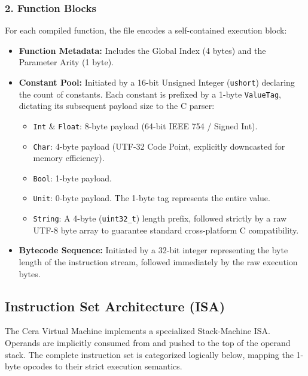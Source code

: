 \documentclass[11pt, a4paper]{article}
\begin{document}
\subsubsection*{2. Function Blocks}
For each compiled function, the file encodes a self-contained execution block:
\begin{itemize}
    \item \textbf{Function Metadata:} Includes the Global Index (4 bytes) and the Parameter Arity (1 byte).
    \item \textbf{Constant Pool:} Initiated by a 16-bit Unsigned Integer (\texttt{ushort}) declaring the count of constants. Each constant is prefixed by a 1-byte \texttt{ValueTag}, dictating its subsequent payload size to the C parser:
    \begin{itemize}
        \item \texttt{Int} \& \texttt{Float}: 8-byte payload (64-bit IEEE 754 / Signed Int).
        \item \texttt{Char}: 4-byte payload (UTF-32 Code Point, explicitly downcasted for memory efficiency).
        \item \texttt{Bool}: 1-byte payload.
        \item \texttt{Unit}: 0-byte payload. The 1-byte tag represents the entire value.
        \item \texttt{String}: A 4-byte (\texttt{uint32\_t}) length prefix, followed strictly by a raw UTF-8 byte array to guarantee standard cross-platform C compatibility.
    \end{itemize}
    \item \textbf{Bytecode Sequence:} Initiated by a 32-bit integer representing the byte length of the instruction stream, followed immediately by the raw execution bytes.
\end{itemize}

\subsection{Instruction Set Architecture (ISA)}
\noindent
The Cera Virtual Machine implements a specialized Stack-Machine ISA. Operands are implicitly consumed from and pushed to the top of the operand stack. The complete instruction set is categorized logically below, mapping the 1-byte opcodes to their strict execution semantics.
\end{document}
